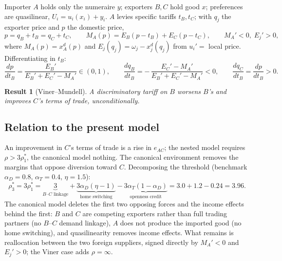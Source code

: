 \documentclass[11pt]{article}
\newtheorem{result}{Result}[section]
\begin{document}
Importer $A$ holds only the numeraire $y$; exporters $B, C$ hold good $x$; preferences are quasilinear, $U_i = u_i(x_i) + y_i$. $A$ levies specific tariffs $t_B, t_C$; with $q_j$ the exporter price and $p$ the domestic price,
\begin{equation}
p = q_B + t_B = q_C + t_C,
\qquad
M_A(p) = E_B(p - t_B) + E_C(p - t_C),
\qquad M_A' < 0, \; E_j' > 0 ,
\label{eq:pta-mc}
\end{equation}
where $M_A(p) = x_A^d(p)$ and $E_j(q_j) = \omega_j - x_j^d(q_j)$ from $u_i' = $ local price. Differentiating in $t_B$:
\begin{equation}
\frac{dp}{dt_B} = \frac{E_B'}{E_B' + E_C' - M_A'} \in (0, 1),
\qquad
\frac{dq_B}{dt_B} = -\,\frac{E_C' - M_A'}{E_B' + E_C' - M_A'} < 0,
\qquad
\frac{dq_C}{dt_B} = \frac{dp}{dt_B} > 0 .
\label{eq:pta-cs}
\end{equation}

\begin{result}[Viner--Mundell]
A discriminatory tariff on $B$ worsens $B$'s and improves $C$'s terms of trade, unconditionally.
\label{res:viner}
\end{result}

\subsection{Relation to the present model}

An improvement in $C$'s terms of trade is a rise in $e_{AC}$; the nested model requires $\rho > 3\rho_1^*$, the canonical model nothing. The canonical environment removes the margins that oppose diversion toward $C$. Decomposing the threshold (benchmark $\alpha_D = 0.8$, $\alpha_T = 0.4$, $\eta = 1.5$):
\begin{equation}
\rho_3^* = 3\rho_1^* = \underbrace{3}_{\text{$B$--$C$ linkage}}
+ \underbrace{3\alpha_D(\eta-1)}_{\text{home switching}}
- \underbrace{3\alpha_T(1-\alpha_D)}_{\text{openness credit}}
= 3.0 + 1.2 - 0.24 = 3.96 .
\label{eq:pta-decomp}
\end{equation}
The canonical model deletes the first two opposing forces and the income effects behind the first: $B$ and $C$ are competing exporters rather than full trading partners (no $B$--$C$ demand linkage), $A$ does not produce the imported good (no home switching), and quasilinearity removes income effects. What remains is reallocation between the two foreign suppliers, signed directly by $M_A' < 0$ and $E_j' > 0$; the Viner case adds $\rho = \infty$.
\end{document}
